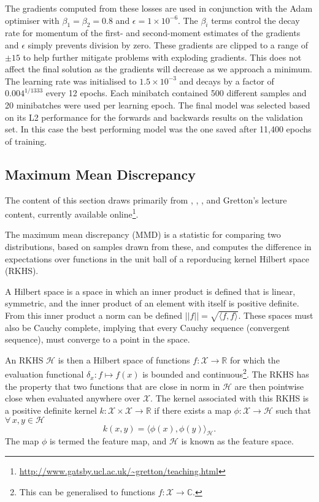 The gradients computed from these losses are used in conjunction with the Adam optimiser \citep{2014Kingma} with $\beta_1=\beta_2=0.8$ and $\epsilon=1\times10^{-6}$.
The $\beta_i$ terms control the decay rate for momentum of the first- and second-moment estimates of the gradients and $\epsilon$ simply prevents division by zero.
These gradients are clipped to a range of $\pm15$ to help further mitigate problems with exploding gradients.
This does not affect the final solution as the gradients will decrease as we approach a minimum.
The learning rate was initialised to $1.5\times10^{-3}$ and decays by a factor of $0.004^{1/1333}$ every 12 epochs.
Each minibatch contained 500 different samples and 20 minibatches were used per learning epoch.
The final model was selected based on its L2 performance for the forwards and backwards results on the validation set.
In this case the best performing model was the one saved after 11,400 epochs of training.



\subsection{Maximum Mean Discrepancy}\label{Sec:Mmd}

The content of this section draws primarily from \citet{Sriperumbudur2009}, \citet{2012Gretton}, \citet{Muandet2017}, and Gretton's lecture content, currently available online\footnote{\url{http://www.gatsby.ucl.ac.uk/~gretton/teaching.html}}.

The maximum mean discrepancy (MMD) is a statistic for comparing two distributions, based on samples drawn from these, and computes the difference in expectations over functions in the unit ball of a reporducing kernel Hilbert space (RKHS).

A Hilbert space is a space in which an inner product is defined that is linear, symmetric, and the inner product of an element with itself is positive definite.
From this inner product a norm can be defined $||f|| = \sqrt{\langle f, f \rangle}$.
These spaces must also be Cauchy complete, implying that every Cauchy sequence (convergent sequence), must converge to a point in the space.

An RKHS $\mathcal{H}$ is then a Hilbert space of functions $f : \mathcal{X} \rightarrow \mathbb{R}$ for which the evaluation functional $\delta_x : f \mapsto f(x)$ is bounded and continuous\footnote{This can be generalised to functions $f : \mathcal{X} \rightarrow \mathbb{C}$.}.
The RKHS has the property that two functions that are close in norm in $\mathcal{H}$ are then pointwise close when evaluated anywhere over $\mathcal{X}$.
The kernel associated with this RKHS is a positive definite kernel $k : \mathcal{X} \times \mathcal{X} \rightarrow \mathbb{R}$ if there exists a map $\phi : \mathcal{X} \rightarrow \mathcal{H}$ such that $\forall\, x,y \in \mathcal{H}$
\begin{equation}
    k(x,y) = \langle \phi(x), \phi(y) \rangle_\mathcal{H}.
\end{equation}
The map $\phi$ is termed the feature map, and $\mathcal{H}$ is known as the feature space.

